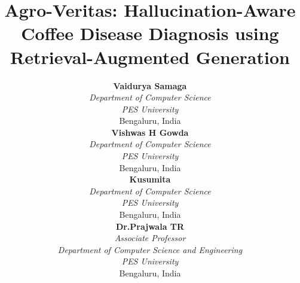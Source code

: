 \documentclass[conference]{IEEEtran}
\begin{document}
\title{Agro-Veritas: Hallucination-Aware Coffee Disease Diagnosis using Retrieval-Augmented Generation}

\author{
\small
\begin{minipage}[t]{0.23\textwidth}\centering
\textbf{Vaidurya Samaga}\\
\textit{Department of Computer Science}\\
\textit{PES University}\\
Bengaluru, India
\end{minipage}\hspace{0.01\textwidth}
\begin{minipage}[t]{0.23\textwidth}\centering
\textbf{Vishwas H Gowda}\\
\textit{Department of Computer Science}\\
\textit{PES University}\\
Bengaluru, India
\end{minipage}\hspace{0.01\textwidth}
\begin{minipage}[t]{0.23\textwidth}\centering
\textbf{Kusumita}\\
\textit{Department of Computer Science}\\
\textit{PES University}\\
Bengaluru, India
\end{minipage}\hspace{0.01\textwidth}
\begin{minipage}[t]{0.23\textwidth}\centering
\textbf{Dr.Prajwala TR}\\
\textit{Associate Professor}\\
\textit{Department of Computer Science and Engineering}\\
\textit{PES University}\\
Bengaluru, India
\end{minipage}
}

\maketitle
\end{document}
